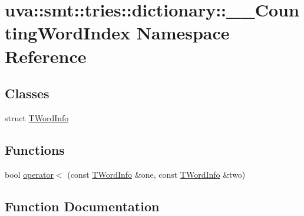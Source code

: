 \hypertarget{namespaceuva_1_1smt_1_1tries_1_1dictionary_1_1_____counting_word_index}{}\section{uva\+:\+:smt\+:\+:tries\+:\+:dictionary\+:\+:\+\_\+\+\_\+\+Counting\+Word\+Index Namespace Reference}
\label{namespaceuva_1_1smt_1_1tries_1_1dictionary_1_1_____counting_word_index}
\subsection*{Classes}
\begin{DoxyCompactItemize}
\item 
struct \hyperlink{structuva_1_1smt_1_1tries_1_1dictionary_1_1_____counting_word_index_1_1_t_word_info}{T\+Word\+Info}
\end{DoxyCompactItemize}
\subsection*{Functions}
\begin{DoxyCompactItemize}
\item 
bool \hyperlink{namespaceuva_1_1smt_1_1tries_1_1dictionary_1_1_____counting_word_index_a38690f2dbfdf6979c315fd3ce4c865ea}{operator$<$} (const \hyperlink{structuva_1_1smt_1_1tries_1_1dictionary_1_1_____counting_word_index_1_1_t_word_info}{T\+Word\+Info} \&one, const \hyperlink{structuva_1_1smt_1_1tries_1_1dictionary_1_1_____counting_word_index_1_1_t_word_info}{T\+Word\+Info} \&two)
\end{DoxyCompactItemize}


\subsection{Function Documentation}
\hypertarget{namespaceuva_1_1smt_1_1tries_1_1dictionary_1_1_____counting_word_index_a38690f2dbfdf6979c315fd3ce4c865ea}{}
